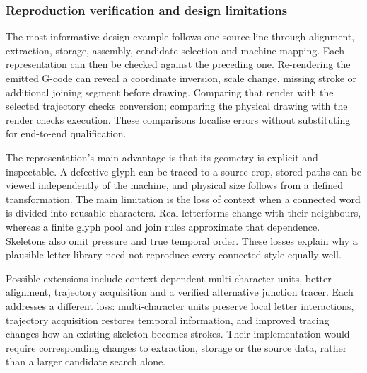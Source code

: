 \subsubsection{Reproduction verification and design limitations}
The most informative design example follows one source line through alignment, extraction, storage, assembly, candidate selection and machine mapping. Each representation can then be checked against the preceding one. Re-rendering the emitted G-code can reveal a coordinate inversion, scale change, missing stroke or additional joining segment before drawing. Comparing that render with the selected trajectory checks conversion; comparing the physical drawing with the render checks execution. These comparisons localise errors without substituting for end-to-end qualification.

The representation's main advantage is that its geometry is explicit and inspectable. A defective glyph can be traced to a source crop, stored paths can be viewed independently of the machine, and physical size follows from a defined transformation. The main limitation is the loss of context when a connected word is divided into reusable characters. Real letterforms change with their neighbours, whereas a finite glyph pool and join rules approximate that dependence. Skeletons also omit pressure and true temporal order. These losses explain why a plausible letter library need not reproduce every connected style equally well.

Possible extensions include context-dependent multi-character units, better alignment, trajectory acquisition and a verified alternative junction tracer. Each addresses a different loss: multi-character units preserve local letter interactions, trajectory acquisition restores temporal information, and improved tracing changes how an existing skeleton becomes strokes. Their implementation would require corresponding changes to extraction, storage or the source data, rather than a larger candidate search alone.
\FloatBarrier
